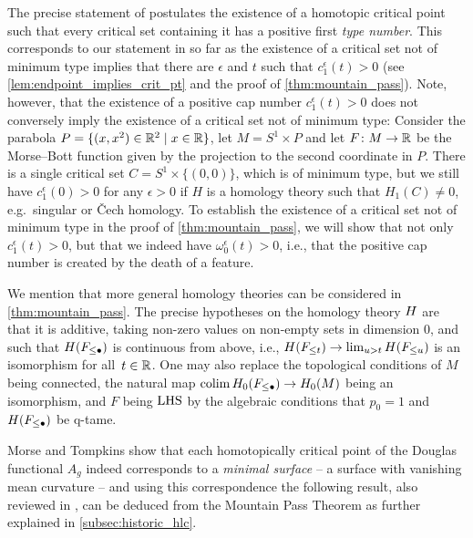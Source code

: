 \begin{rem}\label{rem:mountain_pass_conclusion}
	The precise statement of \cite[Corollary 7.1]{Morse.1939} postulates the existence of a homotopic critical point such that every critical set containing it has a positive first \emph{type number}.
	This corresponds to our statement in so far as the existence of a critical set not of minimum type implies that there are $\epsilon$ and $t$ such that $c_{1}^{\epsilon}(t) > 0$ (see \cref{lem:endpoint_implies_crit_pt} and the proof of \cref{thm:mountain_pass}).
	Note, however, that the existence of a positive cap number $c_{1}^{\epsilon}(t) > 0$ does not conversely imply the existence of a critical set not of minimum type:
	Consider the parabola $P = \{(x,x^2) \in \mathbb{R}^2 \mid x \in \mathbb{R}\}$, let $M = S^1 \times P$ and let $F \colon M \to \mathbb{R}$ be the Morse--Bott function given by the projection to the second coordinate in $P$.
	There is a single critical set $C = S^1 \times \{(0,0)\}$, which is of minimum type, but we still have $c_{1}^{\epsilon}(0) > 0$ for any $\epsilon > 0$ if $H$ is a homology theory such that $H_1(C) \neq 0$, e.g.\ singular or \v{C}ech homology.
	To establish the existence of a critical set not of minimum type in the proof of \cref{thm:mountain_pass}, we will show that not only $c_{1}^{\epsilon}(t) > 0$, but that we indeed have $\omega_0^{\epsilon}(t) > 0$, i.e., that the positive cap number is created by the death of a feature.
\end{rem}

\begin{rem}
	We mention that more general homology theories can be considered in \cref{thm:mountain_pass}.
	The precise hypotheses on the homology theory $H$ are that it is additive, taking non-zero values on non-empty sets in dimension $0$, and such that $H(F_{\leq \bullet})$ is continuous from above, i.e., $H(F_{\leq t}) \to \lim_{u > t} H(F_{\leq u})$ is an isomorphism for all~$t \in \mathbb{R}$.
	One may also replace the topological conditions of $M$ being connected, the natural map $\operatorname*{colim} H_0(F_{\leq \bullet}) \to H_0(M)$ being an isomorphism, and $F$ being $\mathrm{LHS}$ by the algebraic conditions that $p_0 = 1$ and $H(F_{\leq \bullet})$ be q-tame.
\end{rem}

Morse and Tompkins show \cite[Theorem 6.2]{Morse.1939} that each homotopically critical point of the Douglas functional $A_g$ indeed corresponds to
%
a \emph{minimal surface} -- a surface with vanishing mean curvature -- and using this correspondence the following result, also reviewed in \cite[Theorem II.6.10]{Struwe.1988}, can be deduced from the Mountain Pass Theorem as further explained in \cref{subsec:historic_hlc}.

